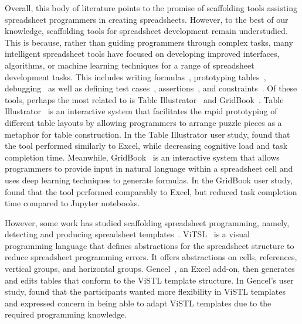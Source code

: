 Overall, this body of literature points to the promise of scaffolding tools assisting spreadsheet programmers in creating spreadsheets.
However, to the best of our knowledge, scaffolding tools for spreadsheet development remain understudied.
This is because, rather than guiding programmers through complex tasks, many intelligent spreadsheet tools have focused on developing improved interfaces, algorithms, or machine learning techniques for a range of spreadsheet development tasks.
This includes writing formulas~\cite{srinivasa2022gridbook}, prototyping tables~\cite{huang2024table}, debugging~\cite{abraham2007goaldebug, myers1991graphical} as well as defining test cases~\cite{burnett2002testing}, assertions~\cite{burnett2003end}, and constraints~\cite{myers1991graphical}.
Of these tools, perhaps the most related to \tool is Table Illustrator~\cite{huang2024table} and GridBook~\cite{srinivasa2022gridbook}.
Table Illustrator~\cite{huang2024table} is an interactive system that facilitates the rapid prototyping of different table layouts by allowing programmers to arrange puzzle pieces as a metaphor for table construction.
In the Table Illustrator user study, \citet{huang2024table} found that the tool performed similarly to Excel, while decreasing cognitive load and task completion time.
Meanwhile, GridBook~\cite{srinivasa2022gridbook} is an interactive system that allows programmers to provide input in natural language within a spreadsheet cell and uses deep learning techniques to generate formulas.
In the GridBook user study, \citet{srinivasa2022gridbook} found that the tool performed comparably to Excel, but reduced task completion time compared to Jupyter notebooks.

However, some work has studied scaffolding spreadsheet programming, namely, detecting and producing spreadsheet templates~\cite{abraham2004header, abraham2006inferring, abraham2005visual, erwig2006gencel}.
ViTSL~\cite{abraham2005visual} is a visual programming language that defines abstractions for the spreadsheet structure to reduce spreadsheet programming errors.
It offers abstractions on cells, references, vertical groups, and horizontal groups.
Gencel~\cite{erwig2006gencel}, an Excel add-on, then generates and edits tables that conform to the ViSTL template structure.
In Gencel's user study, \citet{erwig2006gencel} found that the participants wanted more flexibility in ViSTL templates and expressed concern in being able to adapt ViSTL templates due to the required programming knowledge.

